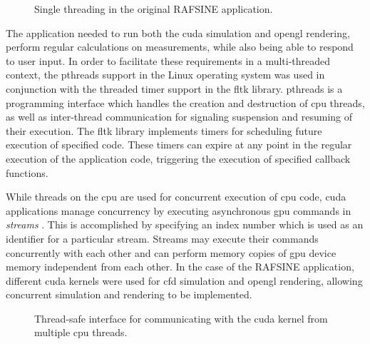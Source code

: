 \begin{figure}[!htb]
\centering 
\begin{scriptsize}
\def\svgwidth{1.0\linewidth}

\end{scriptsize}
\caption{Single threading in the original RAFSINE application.}
\label{fig:singlethreading}
\end{figure}

The application needed to run both the \gls{cuda} simulation and \gls{opengl} rendering, perform regular calculations on measurements, while also being able to respond to user input. In order to facilitate these requirements in a multi-threaded context, the \gls{pthreads} support in the Linux operating system was used in conjunction with the threaded timer support in the \gls{fltk} library. \gls{pthreads} is a programming interface which handles the creation and destruction of \gls{cpu} threads, as well as inter-thread communication for signaling suspension and resuming of their execution. The \gls{fltk} library implements timers for scheduling future execution of specified code. These timers can expire at any point in the regular execution of the application code, triggering the execution of specified callback functions.

While threads on the \gls{cpu} are used for concurrent execution of \gls{cpu} code, \gls{cuda} applications manage concurrency by executing asynchronous \gls{gpu} commands in \textit{streams} \cite{cuda_streams}. This is accomplished by specifying an index number which is used as an identifier for a particular stream. Streams may execute their commands concurrently with each other and can perform memory copies of \gls{gpu} device memory independent from each other. In the case of the RAFSINE application, different \gls{cuda} kernels were used for \gls{cfd} simulation and \gls{opengl} rendering, allowing concurrent simulation and rendering to be implemented.

\begin{figure}[!htb]
\centering 
\begin{scriptsize}
\def\svgwidth{0.5\linewidth}

\end{scriptsize}
\caption{Thread-safe interface for communicating with the \gls{cuda} kernel from multiple \gls{cpu} threads.}
\label{fig:multithreading}
\end{figure}

